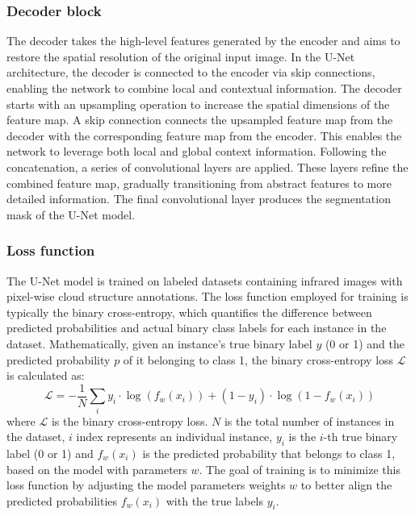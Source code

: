 \documentclass[remotesensing,article,submit,pdftex,moreauthors]{Definitions/mdpi}
\begin{document}
\subsubsection{Decoder block}

The decoder takes the high-level features generated by the encoder and aims to restore the spatial resolution of the original input image. In the U-Net architecture, the decoder is connected to the encoder via skip connections, enabling the network to combine local and contextual information. The decoder starts with an upsampling operation to increase the spatial dimensions of the feature map. A skip connection connects the upsampled feature map from the decoder with the corresponding feature map from the encoder. This enables the network to leverage both local and global context information. Following the concatenation, a series of convolutional layers are applied. These layers refine the combined feature map, gradually transitioning from abstract features to more detailed information. The final convolutional layer produces the segmentation mask of the U-Net model.

\subsubsection{Loss function}

The U-Net model is trained on labeled datasets containing infrared images with pixel-wise cloud structure annotations. The loss function employed for training is typically the binary cross-entropy, which quantifies the difference between predicted probabilities and actual binary class labels for each instance in the dataset. Mathematically, given an instance's true binary label $y$ (0 or 1) and the predicted probability $p$ of it belonging to class 1, the binary cross-entropy loss $\mathcal{L}$ is calculated as:
\begin{equation}
	\mathcal{L} = -\frac{1}{N}\sum_i y_i\cdot\log\left(f_w(x_i)\right) + (1-y_i)\cdot\log\left(1-f_w(x_i)\right)
\end{equation}
where $\mathcal{L}$ is the binary cross-entropy loss. $N$ is the total number of instances in the dataset, $i$ index represents an individual instance, $y_{i}$ is the $i$-th true binary label (0 or 1) and $f_w(x_i)$ is the predicted probability that belongs to class 1, based on the model with parameters $w$.
The goal of training is to minimize this loss function by adjusting the model parameters weights $w$ to better align the predicted probabilities $f_w(x_i)$ with the true labels $y_{i}$.
\end{document}
